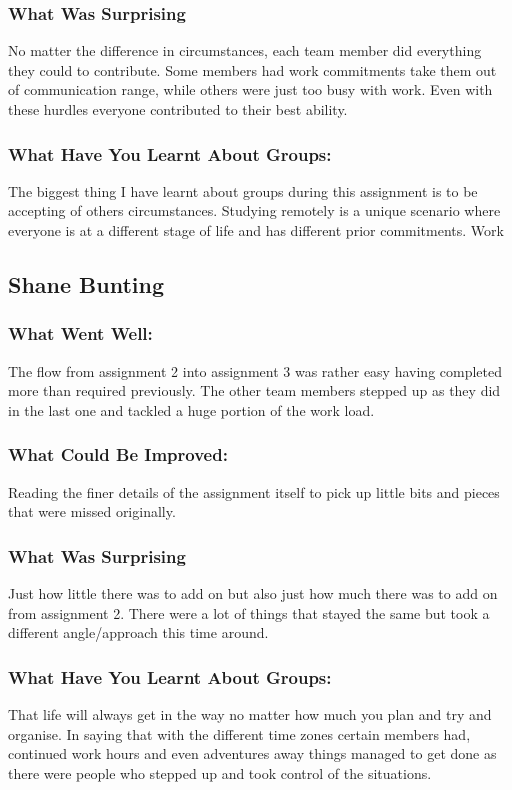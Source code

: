 \documentclass[11pt, oneside, a4paper, titlepage]{article}
\begin{document}
\subsubsection{What Was Surprising}
No matter the difference in circumstances, each team member did everything they  could to contribute. Some members had work commitments take them out of communication range, while others were just too busy with work. Even with these hurdles everyone contributed to their best ability. 

\subsubsection{What Have You Learnt About Groups:}
The biggest thing I have learnt about groups during this assignment is to be accepting of others circumstances. Studying remotely is a unique scenario where everyone is at a different stage of life and has different prior commitments. Work 

\subsection{Shane Bunting}
\subsubsection{What Went Well:}
The flow from assignment 2 into assignment 3 was rather easy having completed more than required previously. The other team members stepped up as they did in the last one and tackled a huge portion of the work load. 

\subsubsection{What Could Be Improved:}
Reading the finer details of the assignment itself to pick up little bits and pieces that were missed originally.  

\subsubsection{What Was Surprising}
Just how little there was to add on but also just how much there was to add on from assignment 2. There were a lot of things that stayed the same but took a different angle/approach this time around. 

\subsubsection{What Have You Learnt About Groups:}
That life will always get in the way no matter how much you plan and try and organise. In saying that with the different time zones certain members had, continued work hours and even adventures away things managed to get done as there were people who stepped up and took control of the situations.  
\end{document}
